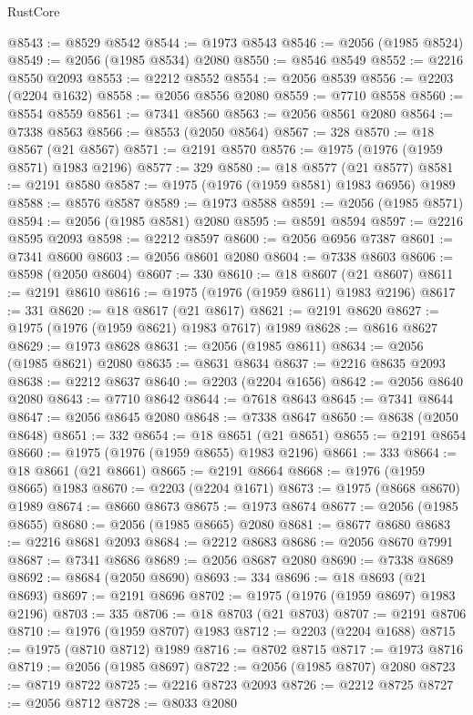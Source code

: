 \begin{lexlean}{RustCore}
\begin{coremodule}
@8543 := @8529 @8542
@8544 := @1973 @8543
@8546 := @2056 (@1985 @8524)
@8549 := @2056 (@1985 @8534) @2080
@8550 := @8546 @8549
@8552 := @2216 @8550 @2093
@8553 := @2212 @8552
@8554 := @2056 @8539
@8556 := @2203 (@2204 @1632)
@8558 := @2056 @8556 @2080
@8559 := @7710 @8558
@8560 := @8554 @8559
@8561 := @7341 @8560
@8563 := @2056 @8561 @2080
@8564 := @7338 @8563
@8566 := @8553 (@2050 @8564)
@8567 := 328
@8570 := @18 @8567 (@21 @8567)
@8571 := @2191 @8570
@8576 := @1975 (@1976 (@1959 @8571) @1983 @2196)
@8577 := 329
@8580 := @18 @8577 (@21 @8577)
@8581 := @2191 @8580
@8587 := @1975 (@1976 (@1959 @8581) @1983 @6956) @1989
@8588 := @8576 @8587
@8589 := @1973 @8588
@8591 := @2056 (@1985 @8571)
@8594 := @2056 (@1985 @8581) @2080
@8595 := @8591 @8594
@8597 := @2216 @8595 @2093
@8598 := @2212 @8597
@8600 := @2056 @6956 @7387
@8601 := @7341 @8600
@8603 := @2056 @8601 @2080
@8604 := @7338 @8603
@8606 := @8598 (@2050 @8604)
@8607 := 330
@8610 := @18 @8607 (@21 @8607)
@8611 := @2191 @8610
@8616 := @1975 (@1976 (@1959 @8611) @1983 @2196)
@8617 := 331
@8620 := @18 @8617 (@21 @8617)
@8621 := @2191 @8620
@8627 := @1975 (@1976 (@1959 @8621) @1983 @7617) @1989
@8628 := @8616 @8627
@8629 := @1973 @8628
@8631 := @2056 (@1985 @8611)
@8634 := @2056 (@1985 @8621) @2080
@8635 := @8631 @8634
@8637 := @2216 @8635 @2093
@8638 := @2212 @8637
@8640 := @2203 (@2204 @1656)
@8642 := @2056 @8640 @2080
@8643 := @7710 @8642
@8644 := @7618 @8643
@8645 := @7341 @8644
@8647 := @2056 @8645 @2080
@8648 := @7338 @8647
@8650 := @8638 (@2050 @8648)
@8651 := 332
@8654 := @18 @8651 (@21 @8651)
@8655 := @2191 @8654
@8660 := @1975 (@1976 (@1959 @8655) @1983 @2196)
@8661 := 333
@8664 := @18 @8661 (@21 @8661)
@8665 := @2191 @8664
@8668 := @1976 (@1959 @8665) @1983
@8670 := @2203 (@2204 @1671)
@8673 := @1975 (@8668 @8670) @1989
@8674 := @8660 @8673
@8675 := @1973 @8674
@8677 := @2056 (@1985 @8655)
@8680 := @2056 (@1985 @8665) @2080
@8681 := @8677 @8680
@8683 := @2216 @8681 @2093
@8684 := @2212 @8683
@8686 := @2056 @8670 @7991
@8687 := @7341 @8686
@8689 := @2056 @8687 @2080
@8690 := @7338 @8689
@8692 := @8684 (@2050 @8690)
@8693 := 334
@8696 := @18 @8693 (@21 @8693)
@8697 := @2191 @8696
@8702 := @1975 (@1976 (@1959 @8697) @1983 @2196)
@8703 := 335
@8706 := @18 @8703 (@21 @8703)
@8707 := @2191 @8706
@8710 := @1976 (@1959 @8707) @1983
@8712 := @2203 (@2204 @1688)
@8715 := @1975 (@8710 @8712) @1989
@8716 := @8702 @8715
@8717 := @1973 @8716
@8719 := @2056 (@1985 @8697)
@8722 := @2056 (@1985 @8707) @2080
@8723 := @8719 @8722
@8725 := @2216 @8723 @2093
@8726 := @2212 @8725
@8727 := @2056 @8712
@8728 := @8033 @2080

\end{coremodule}
\end{lexlean}
